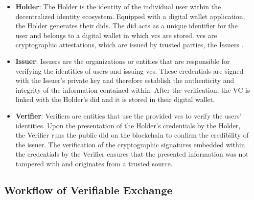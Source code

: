 \begin{itemize}
  \item \textbf{Holder}: The Holder is the identity of the individual user within the decentralized identity ecosystem. Equipped with a digital wallet application, the 
  Holder generates their \gls{did}s. The \gls{did} acts as a unique identifier for the user and belongs to a digital wallet in which \gls{vc}s are stored. \gls{vc}s are 
  cryptographic attestations, which are issued by trusted parties, the Issuers \cite{dockio}.
  \item \textbf{Issuer}: Issuers are the organizations or entities that are responsible for verifying the identities of users and issuing \gls{vc}s. These 
  credentials are signed with the Issuer's private key and therefore establish the authenticity and integrity of the information contained within. After the verification, 
  the VC is linked with the Holder's \gls{did} and it is stored in their digital wallet.
  \item \textbf{Verifier}: Verifiers are entities that use the provided \gls{vc}s to verify the users' identities. Upon the presentation of the Holder's 
  credentials by the Holder, the Verifier runs the public \gls{did} on the blockchain to confirm the credibility of the issuer. The verification of the cryptographic signatures 
  embedded within the credentials by the Verifier ensures that the presented information was not tampered with and originates from a trusted source.
\end{itemize}

\subsection{Workflow of Verifiable Exchange}

